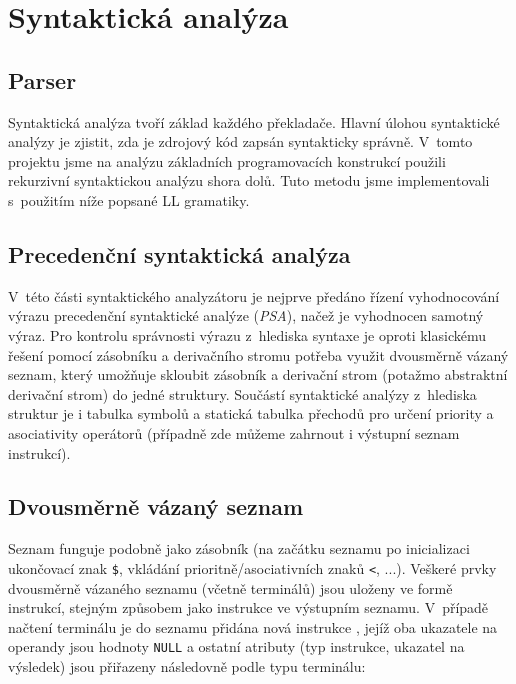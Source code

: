 \documentclass[12pt,a4paper,titlepage,final]{article}
\begin{document}
  \section{Syntaktická analýza} \label{syntakticka-analyza}

    \subsection{Parser}

    Syntaktická analýza tvoří základ každého překladače. Hlavní úlohou
    syntaktické analýzy je zjistit, zda je zdrojový kód zapsán syntakticky
    správně. V~tomto projektu jsme na analýzu základních programovacích
    konstrukcí použili rekurzivní syntaktickou analýzu shora dolů. Tuto
    metodu jsme implementovali s~použitím níže popsané LL gramatiky.

    \subsection{Precedenční syntaktická analýza}

    V~této části syntaktického analyzátoru je nejprve předáno řízení
    vyhodnocování výrazu precedenční syntaktické analýze (\textit{PSA}), načež
    je vyhodnocen samotný výraz. Pro kontrolu správnosti výrazu z~hlediska
    syntaxe je oproti klasickému řešení pomocí zásobníku a derivačního stromu
    potřeba využit dvousměrně vázaný seznam, který umožňuje skloubit zásobník
    a derivační strom (potažmo abstraktní derivační strom) do jedné struktury.
    Součástí syntaktické analýzy z~hlediska struktur je i tabulka symbolů a
    statická tabulka přechodů pro určení priority a asociativity operátorů
    (případně zde můžeme zahrnout i výstupní seznam instrukcí).

    \subsection{Dvousměrně vázaný seznam}

    Seznam funguje podobně jako zásobník (na začátku seznamu po inicializaci
    ukončovací znak \texttt{\$}, vkládání prioritně/asociativních znaků
    \texttt{<}, ...). Veškeré prvky dvousměrně vázaného seznamu (včetně
    terminálů) jsou uloženy ve formě instrukcí, stejným způsobem jako
    instrukce ve výstupním seznamu. V~případě načtení terminálu je do seznamu
    přidána nová \clqq instrukce \crqq, jejíž oba ukazatele na operandy jsou
    hodnoty \texttt{NULL} a ostatní atributy (typ instrukce, ukazatel na
    výsledek) jsou přiřazeny následovně podle typu terminálu:
\end{document}
